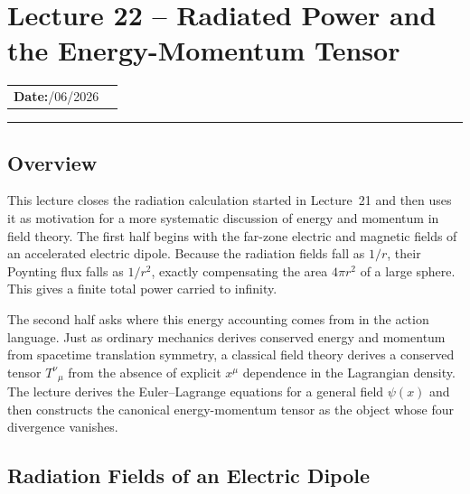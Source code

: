 \section{Lecture 22 -- Radiated Power and the Energy-Momentum Tensor}\label{sec:lec22}

\begin{center}
\begin{tabular}{ll}
  \textbf{Date:}\quad 21/06/2026 & \\
\end{tabular}
\end{center}
\hrule\vspace{1.5em}

\subsection*{Overview}

This lecture closes the radiation calculation started in Lecture~21 and then uses it
as motivation for a more systematic discussion of energy and momentum in field theory.
The first half begins with the far-zone electric and magnetic fields of an accelerated
electric dipole. Because the radiation fields fall as $1/r$, their Poynting flux falls
as $1/r^2$, exactly compensating the area $4\pi r^2$ of a large sphere. This gives a
finite total power carried to infinity.

The second half asks where this energy accounting comes from in the action language.
Just as ordinary mechanics derives conserved energy and momentum from spacetime
translation symmetry, a classical field theory derives a conserved tensor
$T^\nu{}_\mu$ from the absence of explicit $x^\mu$ dependence in the Lagrangian
density. The lecture derives the Euler--Lagrange equations for a general field
$\psi(x)$ and then constructs the canonical energy-momentum tensor as the object whose
four divergence vanishes.

\subsection{Radiation Fields of an Electric Dipole}
\label{subsec:lec22:radiation-fields}

